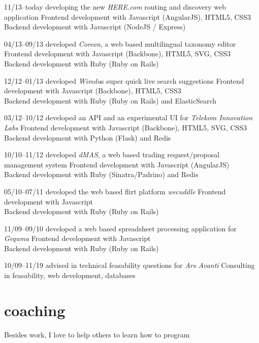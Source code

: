 \documentclass[]{friggeri-cv}
\begin{document}
\begin{entrylist}
  \entry
    {11/13–today}
    {developing the new \emph{HERE.com} routing and discovery web application}
    {}
    {Frontend development with Javascript (AngularJS), HTML5, CSS3\\
     Backend development with Javascript (NodeJS / Express)}

  \entry
    {04/13–09/13}
    {developed \emph{Coreon}, a web based multilingual taxonomy editor}
    {}
    {Frontend development with Javascript (Backbone), HTML5, SVG, CSS3\\
     Backend development with Ruby (Ruby on Rails)}

  \entry
    {12/12–01/13}
    {developed \emph{Wimdu}s super quick live search suggestions}
    {}
    {Frontend development with Javascript (Backbone), HTML5, CSS3\\
     Backend development with Ruby (Ruby on Rails) and ElasticSearch}

  \entry
    {03/12–10/12}
    {developed an API and an experimental UI for \emph{Telekom Innovation Labs}}
    {}
    {Frontend development with Javascript (Backbone), HTML5, SVG, CSS3\\
     Backend development with Python (Flask) and Redis}

  \entry
    {10/10–11/12}
    {developed \emph{dMAS}, a web based trading request/proposal management system}
    {}
    {Frontend development with Javascript (AngularJS)\\
     Backend development with Ruby (Sinatra/Padrino) and Redis}

  \entry
    {05/10–07/11}
    {developed the web based flirt platform \emph{wecuddle}}
    {}
    {Frontend development with Javascript\\
     Backend development with Ruby (Ruby on Rails)}

  \entry
    {11/09–09/10}
    {developed a web based spreadsheet processing application for \emph{Gequma}}
    {}
    {Frontend development with Javascript\\
     Backend development with Ruby (Ruby on Rails)}

  \entry
    {10/09–11/19}
    {advised in technical feasability questions for \emph{Ars Avanti}}
    {}
    {Consulting in feasability, web development, databases}


\end{entrylist}


\section{coaching}
Besides work, I love to help others to learn how to program
\end{document}
